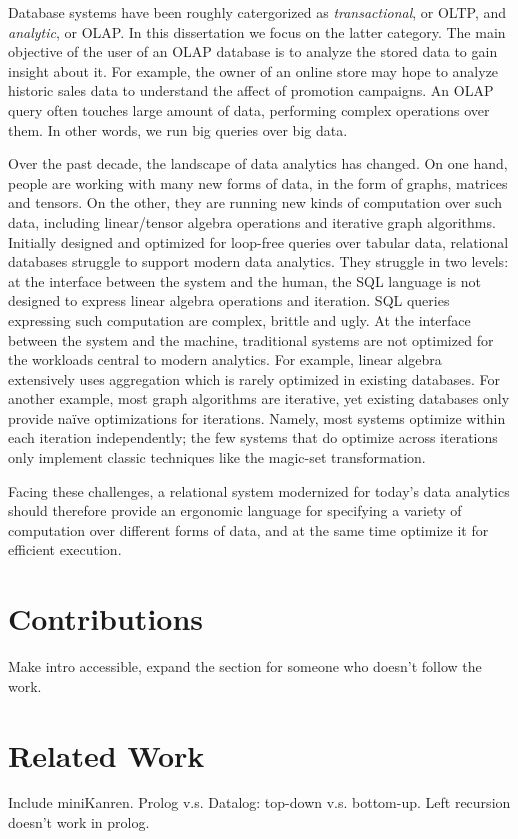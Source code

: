 Database systems have been roughly catergorized as {\em transactional},
 or OLTP, and {\em analytic}, or OLAP.
In this dissertation we focus on the latter category.
The main objective of the user of an OLAP database 
 is to analyze the stored data to gain insight about it.
For example, the owner of an online store may hope to 
 analyze historic sales data to understand 
 the affect of promotion campaigns.
An OLAP query often touches large amount of data,
 performing complex operations over them.
In other words, we run big queries over big data. 

Over the past decade, the landscape of data analytics has changed.
On one hand, people are working with many new forms of data, 
 in the form of graphs, matrices and tensors.
On the other, they are running new kinds of computation 
 over such data, including linear/tensor algebra operations 
 and iterative graph algorithms.
Initially designed and optimized for loop-free queries over tabular data,
 relational databases struggle to support modern data analytics. 
They struggle in two levels: 
 at the interface between the system and the human,  
 the SQL language is not designed to express linear algebra operations 
 and iteration. 
SQL queries expressing such computation are complex,
 brittle and ugly.
At the interface between the system and the machine,
 traditional systems are not optimized for the workloads 
 central to modern analytics.
For example, linear algebra extensively uses aggregation 
 which is rarely optimized in existing databases.
For another example, most graph algorithms are iterative,
 yet existing databases only provide na\"ive optimizations for iterations. 
Namely, most systems optimize within each iteration independently;
 the few systems that do optimize across iterations 
 only implement classic techniques like the magic-set transformation. 

Facing these challenges, a relational system modernized 
 for today's data analytics 
 should therefore provide an ergonomic language 
 for specifying a variety of computation 
 over different forms of data,
 and at the same time optimize it for efficient execution. 

\section{Contributions}
\label{sec:intro:contributions}

Make intro accessible, expand the section for someone who doesn't follow 
 the work. 

\section{Related Work}
\label{sec:intro:related-work}

Include miniKanren. Prolog v.s. Datalog: top-down v.s.
bottom-up. Left recursion doesn't work in prolog. 